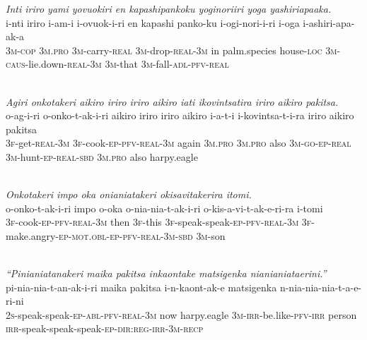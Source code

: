 \documentclass[output=paper]{LSP/langsci}
\begin{document}
\begin{exe}
 \label{Emapp09}
\glt \textit{Inti iriro yami yovuokiri en kapashipankoku yoginoriiri yoga yashiriapaaka.}\\
\gll i-nti iriro i-am-i i-ovuok-i-ri en kapashi panko-ku i-ogi-nori-i-ri i-oga i-ashiri-apa-ak-a\\
\textsc{3m-cop} \textsc{3m.pro} \textsc{3m-}carry\textsc{{}-real} \textsc{3m-}drop\textsc{{}-real-3m} in palm.species house\textsc{{}-loc} \textsc{3m-caus-}lie.down\textsc{{}-real-3m} \textsc{3m-}that \textsc{3m-}fall\textsc{{}-adl-pfv-real}\\
\glt {}\\
\end{exe}
 
\begin{exe}
 \label{Emapp10}
\glt \textit{Agiri onkotakeri aikiro iriro iriro aikiro iati ikovintsatira iriro aikiro pakitsa.}\\
\gll o-ag-i-ri o-onko-t-ak-i-ri aikiro iriro iriro aikiro i-a-t-i i-kovintsa-t-i-ra iriro aikiro pakitsa\\
\textsc{3f-}get\textsc{{}-real-3m} \textsc{3f-}cook\textsc{{}-ep-pfv-real-3m} again \textsc{3m.pro} \textsc{3m.pro} also \textsc{3m-go-ep-real} \textsc{3m-}hunt\textsc{{}-ep-real-sbd} \textsc{3m.pro} also harpy.eagle\\
\glt {}\\
\end{exe}
 
\begin{exe}
 \label{Emapp11}
\glt \textit{Onkotakeri impo oka onianiatakeri okisavitakerira itomi.}\\
\gll o-onko-t-ak-i-ri impo o-oka o-nia-nia-t-ak-i-ri o-kis-a-vi-t-ak-e-ri-ra i-tomi\\
 \textsc{3f-}cook\textsc{{}-ep-pfv-real-3m} then \textsc{3f-}this \textsc{3f-}speak-speak\textsc{{}-ep-pfv-real-3m} \textsc{3f-}make.angry\textsc{{}-ep-mot.obl-ep-pfv-real-3m-sbd} \textsc{3m-}son\\
\glt {}\\
\end{exe}
 
\begin{exe}
 \label{Emapp12}
\glt \textit{``Pinianiatanakeri maika pakitsa inkaontake matsigenka nianianiataerini.''}\\
\gll pi-nia-nia-t-an-ak-i-ri maika pakitsa i-n-kaont-ak-e matsigenka n-nia-nia-nia-t-a-e-ri-ni\\
 \textsc{2s-}speak-speak\textsc{{}-ep-abl-pfv-real-3m} now harpy.eagle \textsc{3m-irr-}be.like\textsc{{}-pfv-irr} person \textsc{irr-}speak-speak-speak\textsc{{}-ep-dir:reg-irr-3m-recp}\\
\glt {}\\
\end{exe}
 
\end{document}
